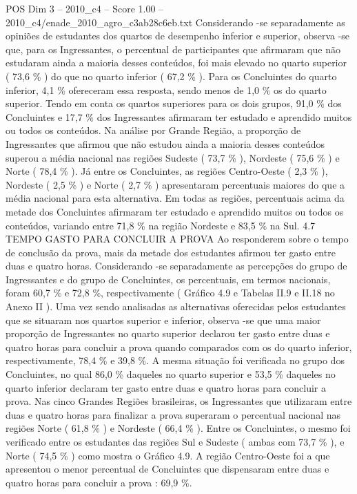 \begin{textsample}{POS Dim 3 – 2010\_c4 – Score 1.00 – 2010\_c4/enade\_2010\_agro\_c3ab28c6eb.txt}
Considerando -se separadamente as opiniões de estudantes dos quartos de desempenho inferior e superior, observa -se que, para os Ingressantes, o percentual de participantes que afirmaram que não estudaram ainda a maioria desses conteúdos, foi mais elevado no quarto superior ( 73,6 \% ) do que no quarto inferior ( 67,2 \% ).
Para os Concluintes do quarto inferior, 4,1 \% ofereceram essa resposta, sendo menos de 1,0 \% os do quarto superior.
Tendo em conta os quartos superiores para os dois grupos, 91,0 \% dos Concluintes e 17,7 \% dos Ingressantes afirmaram ter estudado e aprendido muitos ou todos os conteúdos.
Na análise por Grande Região, a proporção de Ingressantes que afirmou que não estudou ainda a maioria desses conteúdos superou a média nacional nas regiões Sudeste ( 73,7 \% ), Nordeste ( 75,6 \% ) e Norte ( 78,4 \% ).
Já entre os Concluintes, as regiões Centro-Oeste ( 2,3 \% ), Nordeste ( 2,5 \% ) e Norte ( 2,7 \% ) apresentaram percentuais maiores do que a média nacional para esta alternativa.
Em todas as regiões, percentuais acima da metade dos Concluintes afirmaram ter estudado e aprendido muitos ou todos os conteúdos, variando entre 71,8 \% na região Nordeste e 83,5 \% na Sul. 4.7 TEMPO GASTO PARA CONCLUIR A PROVA Ao responderem sobre o tempo de conclusão da prova, mais da metade dos estudantes afirmou ter gasto entre duas e quatro horas.
Considerando -se separadamente as percepções do grupo de Ingressantes e do grupo de Concluintes, os percentuais, em termos nacionais, foram 60,7 \% e 72,8 \%, respectivamente ( Gráfico 4.9 e Tabelas II.9 e II.18 no Anexo II ).
Uma vez sendo analisadas as alternativas oferecidas pelos estudantes que se situaram nos quartos superior e inferior, observa -se que uma maior proporção de Ingressantes no quarto superior declarou ter gasto entre duas e quatro horas para concluir a prova quando comparados com os do quarto inferior, respectivamente, 78,4 \% e 39,8 \%.
A mesma situação foi verificada no grupo dos Concluintes, no qual 86,0 \% daqueles no quarto superior e 53,5 \% daqueles no quarto inferior declaram ter gasto entre duas e quatro horas para concluir a prova.
Nas cinco Grandes Regiões brasileiras, os Ingressantes que utilizaram entre duas e quatro horas para finalizar a prova superaram o percentual nacional nas regiões Norte ( 61,8 \% ) e Nordeste ( 66,4 \% ).
Entre os Concluintes, o mesmo foi verificado entre os estudantes das regiões Sul e Sudeste ( ambas com 73,7 \% ), e Norte ( 74,5 \% ) como mostra o Gráfico 4.9.
A região Centro-Oeste foi a que apresentou o menor percentual de Concluintes que dispensaram entre duas e quatro horas para concluir a prova : 69,9 \%.

\end{textsample}

